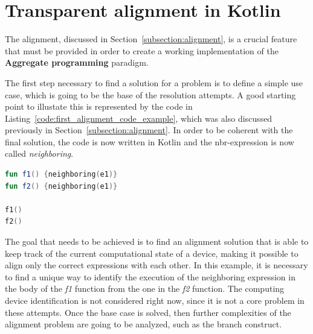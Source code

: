 \chapter{Transparent alignment in Kotlin}\label{chapter:alignment}
The alignment, discussed in Section~\ref{subsection:alignment}, is a crucial feature that must be provided in order to create a working implementation of the \textbf{Aggregate programming} paradigm. 

The first step necessary to find a solution for a problem is to define a simple use case, which is going to be the base of the resolution attempts. A good starting point to illustate this is represented by the code in Listing~\ref{code:first_alignment_code_example}, which was also discussed previously in Section~\ref{subsection:alignment}. In order to be coherent with the final solution, the code is now written in Kotlin and the nbr-expression is now called \textit{neighboring}.
\begin{lstlisting}[caption={Starting point code to resolve the alignment problem}, captionpos=b, language=Kotlin, label={code:first_alignment_code_example}]
fun f1() {neighboring(e1)}
fun f2() {neighboring(e1)}
        
f1()
f2()
\end{lstlisting}
The goal that needs to be achieved is to find an alignment solution that is able to keep track of the current computational state of a device, making it possible to align only the correct expressions with each other. In this example, it is necessary to find a unique way to identify the execution of the neighboring expression in the body of the \textit{f1} function from the one in the \textit{f2} function.\newline
The computing device identification is not considered right now, since it is not a core problem in these attempts. Once the base case is solved, then further complexities of the alignment problem are going to be analyzed, such as the branch construct.

